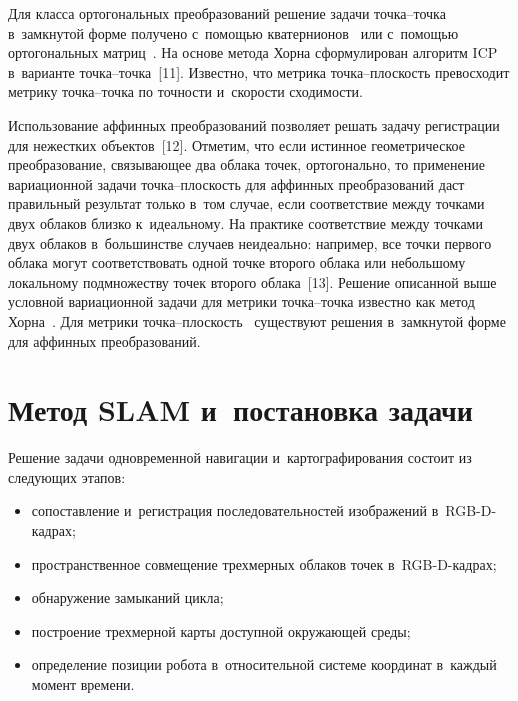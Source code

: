 \begin{multicols}{2}
 Для класса ортогональных 
преобразований решение задачи точ\-ка--точ\-ка в~замк\-ну\-той форме получено 
с~по\-мощью кватернионов~\cite{8-voh} или с~помощью ортогональных 
мат\-риц~\cite{9-voh}. На основе метода Хорна сформулирован алгоритм ICP 
в~варианте точ\-ка--точ\-ка~[11]. Известно, что метрика точ\-ка--плос\-кость 
превосходит метрику точ\-ка--точ\-ка по точ\-ности и~ско\-рости схо\-ди\-мости. 

Использование аффинных преобразований позво\-ля\-ет решать задачу 
регистрации для нежестких объектов~[12]. Отметим, что если истинное 
гео\-мет\-ри\-че\-ское преобразование, связывающее два облака точек, ортогонально, 
то применение вариационной задачи точ\-ка--плос\-кость для аффинных 
преобразований даст правильный результат только в~том случае, если 
соответствие между точками двух облаков близко к~идеальному. На практике 
соответствие между точками двух облаков в~большинстве случаев неидеально: 
например, все точки первого облака могут соответствовать одной точке второго 
облака или небольшому локальному подмножеству точек второго облака~[13]. 
Решение описанной выше условной вариационной задачи для метрики  
точ\-ка--точ\-ка известно как метод Хорна~\cite{8-voh}. Для мет\-ри\-ки  
точ\-ка--плос\-кость~\cite{14-voh} существуют решения в~замк\-ну\-той форме для 
аффинных преобразований. 
  
\section{Метод SLAM и~постановка задачи}

  Решение задачи одновременной навигации и~картографирования со\-сто\-ит из 
сле\-ду\-ющих этапов: 
\begin{itemize}
\item сопоставление и~регистрация последовательностей 
изображений в~RGB-D-кад\-рах; 
\item пространственное совмещение трехмерных 
облаков точек в~RGB-D-кад\-рах; 
\item обнаружение замыканий цикла; 
\item построение 
трехмерной карты доступной окружающей среды;
\item определение позиции 
робота в~относительной системе координат в~каждый момент времени. 
\end{itemize}


\end{multicols}
